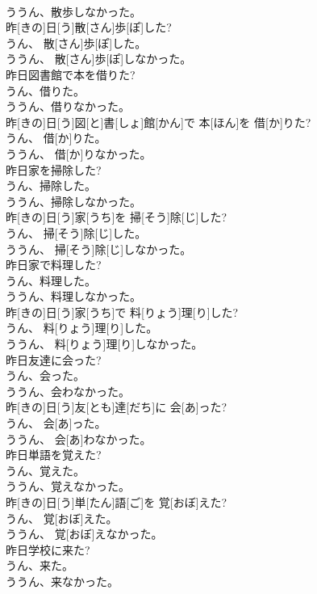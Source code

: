 \documentclass[8pt]{extreport}
\begin{document}
\begin{CJK}{UTF8}{min}
\\	ううん、散歩しなかった。	
\\	昨[きの]日[う]散[さん]歩[ぽ]した? 
\\	うん、 散[さん]歩[ぽ]した。 
\\	ううん、 散[さん]歩[ぽ]しなかった。
\\	昨日図書館で本を借りた? 
\\	うん、借りた。 
\\	ううん、借りなかった。	
\\	昨[きの]日[う]図[と]書[しょ]館[かん]で 本[ほん]を 借[か]りた? 
\\	うん、 借[か]りた。 
\\	ううん、 借[か]りなかった。
\\	昨日家を掃除した? 
\\	うん、掃除した。 
\\	ううん、掃除しなかった。	
\\	昨[きの]日[う]家[うち]を 掃[そう]除[じ]した? 
\\	うん、 掃[そう]除[じ]した。 
\\	ううん、 掃[そう]除[じ]しなかった。
\\	昨日家で料理した? 
\\	うん、料理した。 
\\	ううん、料理しなかった。	
\\	昨[きの]日[う]家[うち]で 料[りょう]理[り]した? 
\\	うん、 料[りょう]理[り]した。 
\\	ううん、 料[りょう]理[り]しなかった。
\\	昨日友達に会った? 
\\	うん、会った。 
\\	ううん、会わなかった。	
\\	昨[きの]日[う]友[とも]達[だち]に 会[あ]った? 
\\	うん、 会[あ]った。 
\\	ううん、 会[あ]わなかった。
\\	昨日単語を覚えた? 
\\	うん、覚えた。 
\\	ううん、覚えなかった。	
\\	昨[きの]日[う]単[たん]語[ご]を 覚[おぼ]えた? 
\\	うん、 覚[おぼ]えた。 
\\	ううん、 覚[おぼ]えなかった。
\\	昨日学校に来た? 
\\	うん、来た。 
\\	ううん、来なかった。	

\end{CJK}
\end{document}
